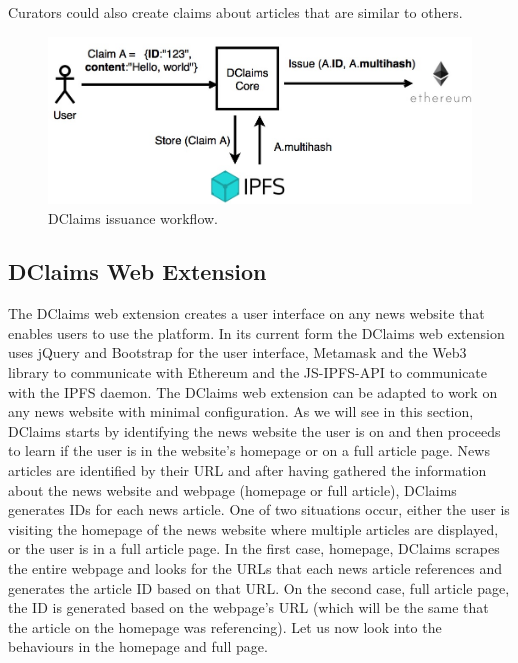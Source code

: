 \documentclass[letterpaper,twocolumn,10pt]{article}
\begin{document}
Curators could also create claims about articles that are similar to others.


\begin{figure}[t]
  \centering
  \includegraphics[width=0.8\columnwidth]{figures/arch2.jpg}
  \caption{DClaims issuance workflow.}
  \label{fig:arch2}
\end{figure}

\subsection{DClaims Web Extension}
The DClaims web extension creates a user interface on any news website that enables users to use the platform.
In its current form the DClaims web extension uses jQuery and Bootstrap for the user interface, Metamask and the Web3 library to communicate with Ethereum and the JS-IPFS-API to communicate with the IPFS daemon.
The DClaims web extension can be adapted to work on any news website with minimal configuration. As we will see in this section, DClaims starts by identifying the news website the user is on and then proceeds to learn if the user is in the website’s homepage or on a full article page.
News articles are identified by their URL and after having gathered the information about the news website and webpage (homepage or full article), DClaims generates IDs for each news article. One of two situations occur, either the user is visiting the homepage of the news website where multiple articles are displayed, or the user is in a full article page. In the first case, homepage, DClaims scrapes the entire webpage and looks for the URLs that each news article references and generates the article ID based on that URL. On the second case, full article page, the ID is generated based on the webpage’s URL (which will be the same that the article on the homepage was referencing). Let us now look into the behaviours in the homepage and full page.
\end{document}

